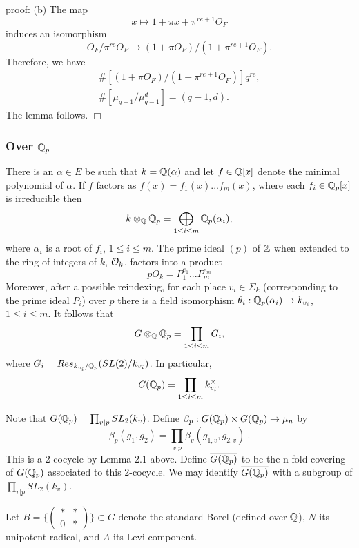 {\sf proof}: (b) The map 
\[
x\longmapsto 1+\pi x+\pi ^{re+1}O_F 
\]
induces an isomorphism 
\[
O_F/\pi ^{re}O_F\rightarrow (1+\pi O_F)/(1+\pi ^{re+1}O_F). 
\]
Therefore, we have 
\[
\begin{array}{c}
\#[(1+\pi O_F)/(1+\pi ^{re+1}O_F)]q^{re}, \\ 
\#[\mu _{q-1}/\mu _{q-1}^d]=(q-1,d).
\end{array}
\]
The lemma follows. $\Box $

\subsubsection{Over ${\Bbb Q}_p$}

There is an $\alpha \in E$ be such that $k={\Bbb Q}(\alpha )$ and let $f\in 
{\Bbb Q}[x]$ denote the minimal polynomial of $\alpha $. If $f$ factors as $%
f(x)=f_1(x)...f_m(x)$, where each $f_i\in {\Bbb Q}_p[x]$ is irreducible then 
\[
k\otimes _{{\Bbb Q}}{\Bbb Q}_p=\bigoplus_{1\leq i\leq m}{\Bbb Q}_p(\alpha
_i), 
\]
where $\alpha _i$ is a root of $f_i$, $1\leq i\leq m$. The prime ideal $(p)$
of ${\Bbb Z}$ when extended to the ring of integers of $k$, ${\cal O}_k$,
factors into a product 
\[
pO_k=P_1^{e_1}...P_m^{e_m} 
\]
Moreover, after a possible reindexing, for each place $v_i\in \Sigma _k$
(corresponding to the prime ideal $P_i$) over $p$ there is a field
isomorphism $\theta _i:{\Bbb Q}_p(\alpha _i)\rightarrow k_{v_i}$, $1\leq
i\leq m$. It follows that 
\begin{equation}
G\otimes _{{\Bbb Q}}{\Bbb Q}_p=\prod_{1\leq i\leq m}G_i,
\end{equation}
where $G_i=Res_{k_{v_i}/{\Bbb Q}_p}(SL(2)/k_{v_i})$. In particular, 
\begin{equation}
G({\Bbb Q}_p)=\prod_{1\leq i\leq m}k_{v_i}^{\times }.
\end{equation}

Note that $G({\Bbb Q}_p)=\prod_{v|p}SL_2(k_v)$. Define $\beta _p:G({\Bbb Q}%
_p)\times G({\Bbb Q}_p)\rightarrow \mu _n$ by 
\[
\beta _p(g_1,g_2)=\prod_{v|p}\beta _v(g_{1,v},g_{2,v})\ . 
\]
This is a 2-cocycle by Lemma 2.1 above. Define $\overline{G({\Bbb Q}_p)}$ to
be the n-fold covering of $G({\Bbb Q}_p)$ associated to this 2-cocycle. We
may identify $\overline{G({\Bbb Q}_p)}$ with a subgroup of $\prod_{v|p}%
\overline{SL_2(k_v)}$.

Let $B=\{\left( 
\begin{array}{cc}
\ast & * \\ 
0 & *
\end{array}
\right) \}\subset G$ denote the standard Borel (defined over ${\Bbb Q}$), $N$
its unipotent radical, and $A$ its Levi component.

